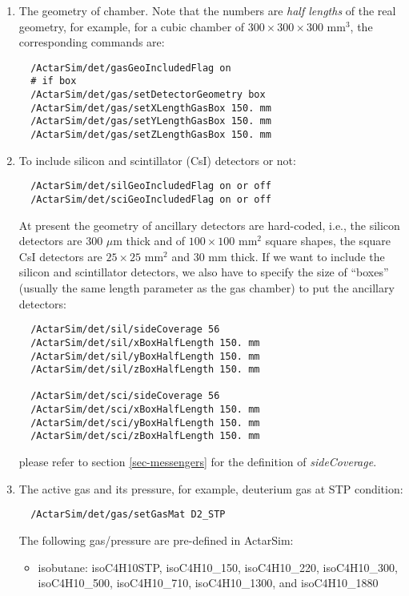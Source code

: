 \begin{enumerate}
\item The geometry of chamber. Note that the numbers are \textit{half lengths} of the real geometry, for example, for a cubic chamber of $300\times300\times300$ mm$^3$, the corresponding commands are:

  \begin{verbatim}
  /ActarSim/det/gasGeoIncludedFlag on
  # if box
  /ActarSim/det/gas/setDetectorGeometry box
  /ActarSim/det/gas/setXLengthGasBox 150. mm
  /ActarSim/det/gas/setYLengthGasBox 150. mm
  /ActarSim/det/gas/setZLengthGasBox 150. mm
  \end{verbatim}

\item To include silicon and scintillator (CsI) detectors or not:
  \begin{verbatim}
  /ActarSim/det/silGeoIncludedFlag on or off
  /ActarSim/det/sciGeoIncludedFlag on or off
  \end{verbatim}
At present the geometry of ancillary detectors are hard-coded, i.e., the silicon detectors are 300 $\mu$m thick and of $100\times100$ mm$^2$ square shapes, the square CsI detectors are $25\times25$ mm$^2$ and 30 mm thick. If we want to include the silicon and scintillator detectors, we also have to specify the size of ``boxes'' (usually the same length parameter as the gas chamber) to put the ancillary detectors:
  \begin{verbatim}
  /ActarSim/det/sil/sideCoverage 56
  /ActarSim/det/sil/xBoxHalfLength 150. mm
  /ActarSim/det/sil/yBoxHalfLength 150. mm
  /ActarSim/det/sil/zBoxHalfLength 150. mm

  /ActarSim/det/sci/sideCoverage 56
  /ActarSim/det/sci/xBoxHalfLength 150. mm
  /ActarSim/det/sci/yBoxHalfLength 150. mm
  /ActarSim/det/sci/zBoxHalfLength 150. mm
  \end{verbatim}
please refer to section \ref{sec-messengers} for the definition of \textit{sideCoverage}.

\item The active gas and its pressure, for example, deuterium gas at STP condition:
  \begin{verbatim}
  /ActarSim/det/gas/setGasMat D2_STP
  \end{verbatim}
The following gas/pressure are pre-defined in ActarSim:
  \begin{itemize}
    \item isobutane: isoC4H10STP, isoC4H10\_150, isoC4H10\_220, isoC4H10\_300, isoC4H10\_500, isoC4H10\_710, isoC4H10\_1300, and isoC4H10\_1880


\end{itemize}
\end{enumerate}
